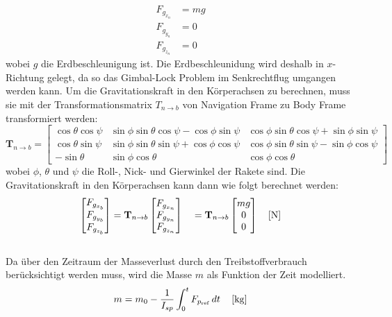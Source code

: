 \begin{align}
F_{g_{x_n}} &= mg \\
F_{g_{y_n}} &= 0 \\
F_{g_{z_n}} &= 0
\end{align}
wobei $g$ die Erdbeschleunigung ist. Die Erdbeschleunidung wird deshalb in $x$-Richtung gelegt, da so das Gimbal-Lock Problem im Senkrechtflug umgangen werden kann. Um die Gravitationskraft in den Körperachsen zu berechnen, muss sie mit der Transformationsmatrix $T_{n \to b}$ von Navigation Frame zu Body Frame transformiert werden: %
\begin{equation}
\mathbf{T}_{n \to b} =
\begin{bmatrix}
\cos\theta \cos\psi &
\sin\phi \sin\theta \cos\psi - \cos\phi \sin\psi &
\cos\phi \sin\theta \cos\psi + \sin\phi \sin\psi \\[6pt]

\cos\theta \sin\psi &
\sin\phi \sin\theta \sin\psi + \cos\phi \cos\psi &
\cos\phi \sin\theta \sin\psi - \sin\phi \cos\psi \\[6pt]

- \sin\theta &
\sin\phi \cos\theta &
\cos\phi \cos\theta
\end{bmatrix}
\quad 
\end{equation}
wobei $\phi$, $\theta$ und $\psi$ die Roll-, Nick- und Gierwinkel der Rakete sind. Die Gravitationskraft in den Körperachsen kann dann wie folgt berechnet werden:
\begin{equation}
\begin{bmatrix}
F_{g_{x_b}} \\
F_{g_{y_b}} \\
F_{g_{z_b}}
\end{bmatrix}
=
\mathbf{T}_{n \to b}
\begin{bmatrix}
F_{g_{x_n}} \\
F_{g_{y_n}} \\
F_{g_{z_n}}
\end{bmatrix}
\quad 
=
\mathbf{T}_{n \to b}
\begin{bmatrix}
mg \\
0 \\
0
\end{bmatrix}
\quad \left[\mathrm{N}\right] \\[6pt]
\end{equation}
\\
Da über den Zeitraum der Masseverlust durch den Treibstoffverbrauch berücksichtigt werden muss, wird die Masse $m$ als Funktion der Zeit modelliert. 
\begin{equation}
m = m_0 - \frac{1}{I_{sp}} \int_{0}^{t} F_{p_{\mathrm{ref}}} \, dt
\quad \left[\mathrm{kg}\right] \\[6pt]
\end{equation}

